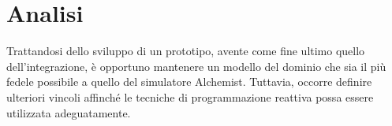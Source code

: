 \documentclass[12pt,a4paper,openright,twoside]{book}
\begin{document}
\section{Analisi}
Trattandosi dello sviluppo di un prototipo, avente come fine ultimo quello dell'integrazione, è opportuno mantenere un modello del dominio che sia il più fedele possibile a quello del simulatore Alchemist. Tuttavia, occorre definire ulteriori vincoli affinché le tecniche di programmazione reattiva possa essere utilizzata adeguatamente. 
\end{document}
